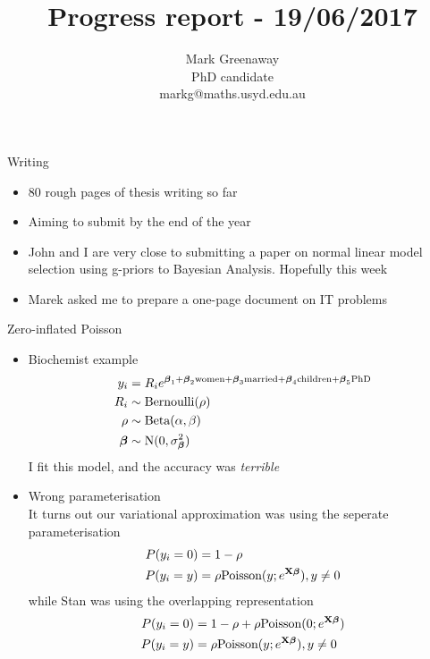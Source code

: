 \documentclass{beamer}
\title{Progress report - 19/06/2017}
\author{Mark Greenaway\\PhD candidate\\markg@maths.usyd.edu.au}
\begin{document}
\begin{frame}
\maketitle
\end{frame}

\begin{frame}{Writing}
\begin{itemize}
\item 80 rough pages of thesis writing so far
\item Aiming to submit by the end of the year
\item John and I are very close to submitting a paper on normal linear model selection using g-priors
to Bayesian Analysis. Hopefully this week
\item Marek asked me to prepare a one-page document on IT problems
\end{itemize}
\end{frame}

\begin{frame}{Zero-inflated Poisson}
\begin{itemize}
\item{Biochemist example}
\begin{align*}
y_i &= R_i e^{{\boldsymbol \beta}_1 + {\boldsymbol \beta}_2 \text{women} + {\boldsymbol \beta}_3 \text{married} + {\boldsymbol \beta}_4 \text{children} + {\boldsymbol \beta}_5 \text{PhD}} \\
R_i &\sim \text{Bernoulli} (\rho) \\
\rho &\sim \text{Beta}(\alpha, \beta) \\
{\boldsymbol \beta} &\sim \text{N}(0, \sigma_{\boldsymbol \beta}^2)
\end{align*}
I fit this model, and the accuracy was \emph{terrible}
\item Wrong parameterisation \\
It turns out our variational approximation was using the seperate parameterisation
\begin{align*}
P(y_i = 0) &= 1 - \rho \\
P(y_i = y) &= \rho \text{Poisson} (y; e^{{\bf X} {\boldsymbol \beta}}), y \ne 0
\end{align*}
while Stan was using the overlapping representation
\begin{align*}
P(y_i = 0) &= 1 - \rho + \rho \text{Poisson} (0; e^{{\bf X} {\boldsymbol \beta}})\\
P(y_i = y) &= \rho \text{Poisson} (y; e^{{\bf X} {\boldsymbol \beta}}), y \ne 0
\end{align*}
\end{itemize}
\end{frame}
\end{document}
